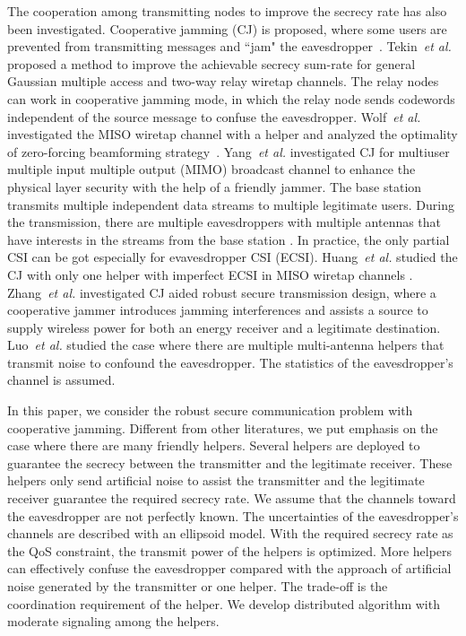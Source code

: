 \documentclass[journal]{IEEEtran}
\begin{document}
The cooperation among transmitting nodes to improve the secrecy rate has also been investigated. Cooperative jamming (CJ) is proposed,  where some users are prevented from transmitting messages and ``jam" the eavesdropper~\cite{tekin2008general,lai2008relay,li2011cooperative,wolf_zero_2010,pei_adaptive_2014,yang_optimal_2013,ding_opportunistic_2011,park_jamming_2013}. Tekin~\emph{et al.} proposed a method to improve the
achievable secrecy sum-rate for general Gaussian multiple access and two-way relay wiretap channels\cite{tekin2008general}. The relay nodes can work in cooperative jamming mode, in which  the relay node sends codewords independent of the source message  to  confuse  the  eavesdropper\cite{lai2008relay,li2011cooperative}. Wolf~\emph{et al.} investigated the MISO wiretap channel with a helper and analyzed the optimality of zero-forcing beamforming strategy~\cite{wolf_zero_2010}. Yang~\emph{et al.} investigated CJ  for  multiuser  multiple  input multiple output (MIMO) broadcast channel to enhance the  physical  layer  security  with  the  help  of  a  friendly  jammer. The base station transmits multiple independent data streams  to  multiple  legitimate  users.  During  the  transmission, there are multiple eavesdroppers with multiple antennas that have interests in the streams from the base station \cite{yang_optimal_2013}. In practice, the only partial CSI can be got especially for evavesdropper CSI (ECSI). Huang~\emph{et al.} studied the CJ with only one
helper with imperfect ECSI in MISO wiretap channels \cite{huang_robust_2012}. Zhang~\emph{et al.} investigated CJ aided robust secure transmission design, where a cooperative jammer introduces jamming interferences and assists a source to supply wireless power for both an energy receiver and a legitimate destination\cite{Zhang_Cooperative2015}. Luo~\emph{et al.} studied the case where there are multiple multi-antenna helpers that transmit noise to confound the eavesdropper. The statistics of the eavesdropper's channel is assumed\cite{luo_uncoordinated_2013}.

In this paper, we consider the robust secure communication problem with cooperative jamming. Different from other literatures, we put emphasis on the case where there are many friendly helpers. Several helpers are deployed to guarantee the secrecy between the transmitter and the legitimate receiver. These helpers only send artificial noise to assist the transmitter and the legitimate receiver guarantee the required secrecy rate. We assume that the channels toward the eavesdropper are not perfectly known.  The uncertainties of the eavesdropper's channels are described with an ellipsoid model.   With the required secrecy rate as the QoS constraint, the transmit power of the helpers is optimized. More helpers can effectively confuse the eavesdropper compared with the approach of artificial noise generated by the transmitter or one helper. The trade-off is the coordination requirement of the helper. We develop distributed algorithm with moderate signaling among the helpers.
\end{document}
